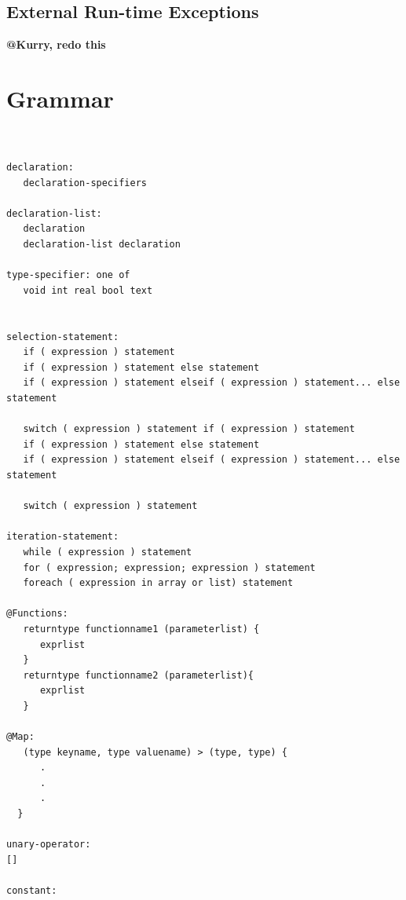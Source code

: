 \documentclass{article}
\begin{document}

\subsection{External Run-time Exceptions} %
\label{sub:external_run_time_exceptions}

\textbf{@Kurry, redo this}



\section{Grammar} %
\label{sec:grammar}

\begin{verbatim}


declaration:
   declaration-specifiers

declaration-list:
   declaration
   declaration-list declaration

type-specifier: one of
   void int real bool text


selection-statement:
   if ( expression ) statement
   if ( expression ) statement else statement
   if ( expression ) statement elseif ( expression ) statement... else statement

   switch ( expression ) statement if ( expression ) statement
   if ( expression ) statement else statement
   if ( expression ) statement elseif ( expression ) statement... else statement
 
   switch ( expression ) statement

iteration-statement:  
   while ( expression ) statement
   for ( expression; expression; expression ) statement
   foreach ( expression in array or list) statement

@Functions:
   return­type function­name­1 (parameter­list) {
      exprlist 
   }
   returntype functionname2 (parameterlist){
      exprlist
   }

@Map: 
   (type key­name, type value­name) ­> (type, type) {
      .
      .
      .
  }

unary-operator:
[]

constant:

\end{verbatim}

\end{document}
